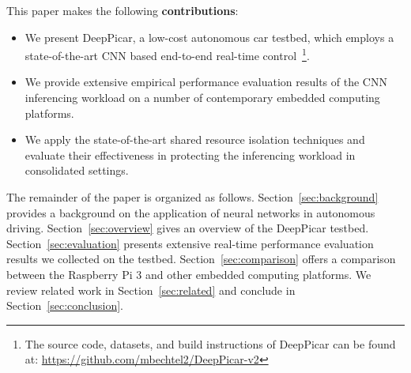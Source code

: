 

This paper makes the following {\bf contributions}:
\begin{itemize}
  \item We present DeepPicar, a low-cost autonomous car testbed, which
    employs a state-of-the-art CNN based end-to-end
    real-time control~\footnote{The source code, datasets, and build
      instructions of DeepPicar can be found at:
      \url{https://github.com/mbechtel2/DeepPicar-v2}}.
  \item We provide extensive empirical performance evaluation results
    of the CNN inferencing workload on a number of contemporary
    embedded computing platforms.
  \item We apply the state-of-the-art shared resource isolation
    techniques and evaluate their effectiveness in protecting the
    inferencing workload in consolidated settings.
\end{itemize}

The remainder of the paper is organized as follows.
Section~\ref{sec:background} provides a background on the application
of neural networks in autonomous driving.
Section~\ref{sec:overview} gives an overview of the DeepPicar
testbed. Section~\ref{sec:evaluation} presents extensive real-time
performance evaluation results we collected on the testbed.
Section~\ref{sec:comparison} offers a comparison between  
the Raspberry Pi 3 and other embedded computing platforms.
We review related work in
Section~\ref{sec:related} and conclude in
Section~\ref{sec:conclusion}.

